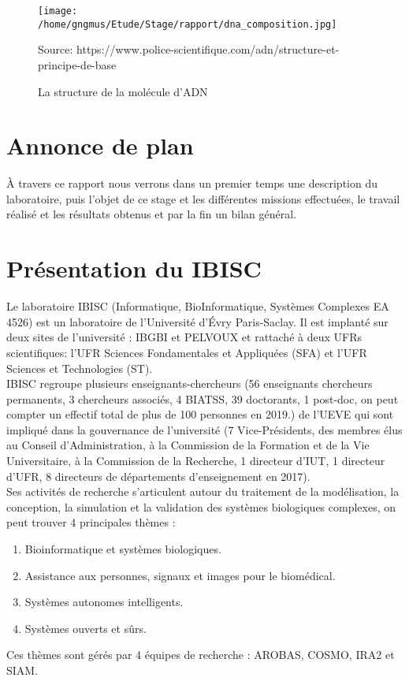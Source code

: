 \documentclass[12pt]{article}
\theoremstyle{definition}
\newcommand{\source}[1]{\caption*{Source: {#1}} }
\begin{document}
	\begin{figure}[h!]
	 \centering
			\texttt{[image: /home/gngmus/Etude/Stage/rapport/dna\_composition.jpg]}
			  \caption{La structure de la molécule d'ADN} \label{imageLabel}
			\source{\scriptsize https://www.police-scientifique.com/adn/structure-et-principe-de-base}
		
	\end{figure}
	
	\pagebreak
	\section{Annonce de plan}
	À travers ce rapport nous verrons dans un premier temps une description du laboratoire, puis l'objet de ce stage et les différentes missions effectuées, le travail réalisé et les résultats obtenus et par la fin un bilan général.\\
	
	\section{Présentation du IBISC}
	Le laboratoire IBISC (Informatique, BioInformatique, Systèmes Complexes EA 4526) est un laboratoire de l’Université d’Évry Paris-Saclay. Il est implanté sur deux sites de l’université : IBGBI et PELVOUX et rattaché à deux UFRs scientifiques: l’UFR Sciences Fondamentales et Appliquées (SFA) et l’UFR Sciences et Technologies (ST). \\
	
	IBISC regroupe plusieurs enseignants-chercheurs (56 enseignants chercheurs permanents, 3 chercheurs associés, 4 BIATSS, 39 doctorants, 1 post-doc, on peut compter un effectif total de plus de 100 personnes en 2019.) de l’UEVE qui sont impliqué dans la gouvernance de l’université (7 Vice-Présidents, des membres élus au Conseil d’Administration, à la Commission de la Formation et de la Vie Universitaire, à la Commission de la Recherche, 1 directeur d’IUT, 1 directeur d’UFR, 8 directeurs de départements d’enseignement en 2017).\\
	
	Ses activités de recherche s'articulent autour du traitement de la modélisation, la conception, la simulation et la validation des systèmes biologiques complexes, on peut trouver 4 principales thèmes : 
	\begin{enumerate}
		\item Bioinformatique et systèmes biologiques.
		\item Assistance aux personnes, signaux et images pour le biomédical.
		\item Systèmes autonomes intelligents.
		\item Systèmes ouverts et sûrs.
	\end{enumerate} 
	Ces thèmes sont gérés par 4 équipes de recherche : AROBAS, COSMO, IRA2 et SIAM.\\
	
\end{document}
